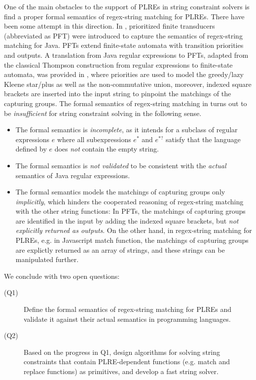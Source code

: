 {One of the main obstacles to the support of PLREs in string constraint solvers is find a proper formal semantics of regex-string matching for PLREs. There have been some attempt in this direction. In \cite{BDM14,BM17}, prioritized finite transducers (abbreviated as PFT) were introduced to capture the semantics of regex-string matching for Java.  PFTs extend finite-state automata with transition priorities and outputs. A translation from Java regular expressions to PFTs, adapted from the classical Thompson construction from regular expressions to finite-state automata, was provided in \cite{BDM14,BM17}, where priorities are used to model the greedy/lazy Kleene star/plus as well as the non-commutative union, moreover, indexed square brackets are inserted into the input string to pinpoint the matchings of the capturing groups.  The formal semantics of regex-string matching in \cite{BDM14,BM17} turns out to be \emph{insufficient} for string constraint solving in the following sense.
\begin{itemize}
\item The formal semantics is \emph{incomplete}, as it intends for a subclass of regular expressions $e$ where all subexpressions $e^*$ and $e^{*?}$ satisfy that the language defined by $e$ does \emph{not} contain the empty string. 
%
\item The formal semantics is \emph{not validated} to be consistent with the \emph{actual} semantics of Java regular expressions.
%
\item The formal semantics models the matchings of capturing groups only \emph{implicitly}, which hinders the cooperated reasoning of regex-string matching with the other string functions: In PFTs, the matchings of capturing groups are identified in the input by adding the indexed square brackets, but \emph{not explicitly returned as outputs}.  On the other hand, in regex-string matching for PLREs, e.g. in Javascript match function, the matchings of capturing groups are explictly returned as an array of strings, and these strings can be manipulated further. 
\end{itemize}

We conclude with two open questions:
\begin{description}
    \item[(Q1)] Define the formal semantics of regex-string matching for PLREs and validate it against their actual semantics in programming languages.
    \item[(Q2)] Based on the progress in Q1, design algorithms for solving string constraints that contain PLRE-dependent functions (e.g. match and replace functions) as primitives, and develop a 
        fast string solver.
\end{description}

}
